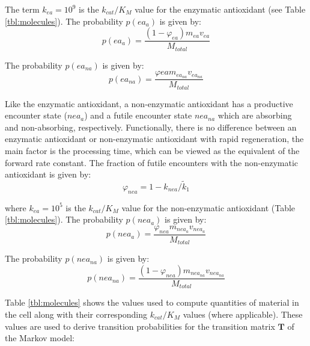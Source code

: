 \documentclass[preprint,12pt,authoryear]{elsarticle}
\begin{document}
The term $k_{ea}= 10^{9}$ is the $k_{cat}/K_M$  value for the enzymatic antioxidant (see Table \ref{tbl:molecules}).
The probability $p(ea_a)$ is given by:
%
\begin{equation}
p(ea_a) =  
\frac{(1-\varphi_{ea}) m_{ea} v_{ea}} {M_{total}}
\end{equation}


The probability $p(ea_{na})$ is given by:
\begin{equation}
p(ea_{na}) = 
\frac{ \varphi{ea}  m_{ea_{na}} v_{ea_{na}}} {M_{total}}
\end{equation}


Like the enzymatic antioxidant, a non-enzymatic antioxidant has a productive encounter 
state ($nea_{a}$) and a futile encounter state $nea_{na}$ which
are absorbing and non-absorbing, respectively.
Functionally, there is no difference between an enzymatic antioxidant or non-enzymatic antioxidant with rapid
regeneration, the main factor is the processing time, which can be
viewed as the equivalent of the forward rate constant. 
The fraction of futile  encounters with the  non-enzymatic antioxidant  is given by:
%
\begin{equation}
\varphi_{nea} = 1 - k_{nea}/\tilde{k}_1
\end{equation}

{\parindent0pt
where $k_{ea} = 10^{5}$ is the $k_{cat}/K_M$  value for the non-enzymatic antioxidant (Table \ref{tbl:molecules}).
%
The probability $p(nea_{a})$ is given by:
}
%
%
\begin{equation}
p(nea_{a}) = 
\frac{\varphi_{nea} m_{nea_a} v_{nea_a}} {M_{total}}
\end{equation}

The probability $p(nea_{na})$ is given by:
%
\begin{equation}
p(nea_{na}) = 
\frac{(1-\varphi_{nea}) m_{nea_{na}} v_{nea_{na}}} {M_{total}}
\end{equation}

Table \ref{tbl:molecules} shows the values used to compute quantities of material in the cell along with their
corresponding $k_{cat}/K_M$ values (where applicable). These values are used to derive transition probabilities for
the transition matrix $\textbf{T}$ of the Markov model:
\end{document}

